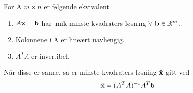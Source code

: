 For A $m\times n$ er følgende ekvivalent
\begin{enumerate}
  \item $A\mathbf{x}=\mathbf{b}$ har unik minste kvadraters løsning
        $\forall\ \vecb\in\R^m$.
  \item Kolonnene i A er lineært uavhengig.
  \item $A^TA$ er invertibel.
\end{enumerate}
Når disse er sanne, så er minste kvadraters løsning $\hat{\mathbf{x}}$ gitt ved
$$\hat{\mathbf{x}} = (A^TA)^{-1}A^T\mathbf{b}$$
